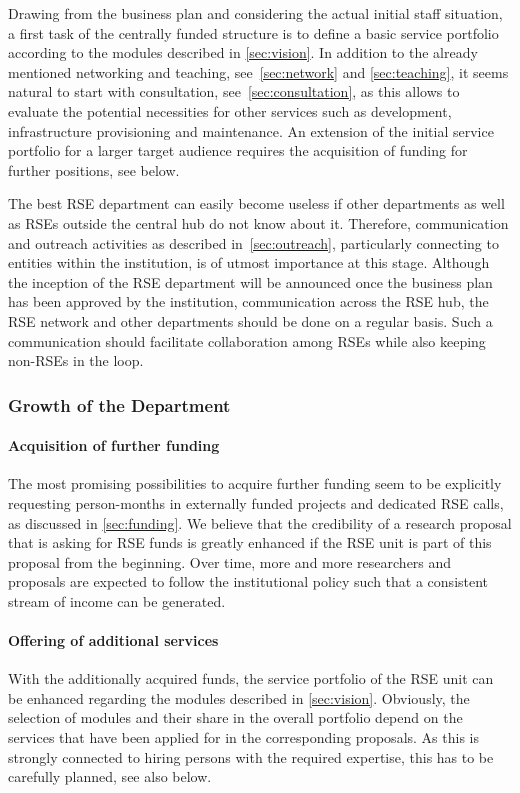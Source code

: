 \documentclass[a4paper]{article}
\begin{document}
Drawing from the business plan and considering the actual initial staff situation, a first task of the centrally funded structure is to define a basic service portfolio according to the modules described in \autoref{sec:vision}.
In addition to the already mentioned networking and teaching, see~\autoref{sec:network} and \autoref{sec:teaching}, it seems natural to start with consultation, see~\autoref{sec:consultation},
as this allows to evaluate the potential necessities for other services such as development, infrastructure provisioning and maintenance.
An extension of the initial service portfolio for a larger target audience requires the acquisition of funding for further positions, see below.

The best RSE department can easily become useless if other departments as well as RSEs outside the central hub do not know about it.
Therefore, communication and outreach activities as described in~\autoref{sec:outreach}, particularly connecting to entities within the institution, is of utmost importance at this stage.
Although the inception of the RSE department will be announced once the business plan has been approved by the institution, communication across the RSE hub, the RSE network and other departments should be done on a regular basis. 
Such a communication should facilitate collaboration among RSEs while also keeping non-RSEs in the loop. 


\subsubsection{Growth of the Department}

\paragraph{Acquisition of further funding}
The most promising possibilities to acquire further funding seem to be explicitly requesting person-months in externally funded projects and dedicated RSE calls, as discussed in \autoref{sec:funding}.
We believe that the credibility of a research proposal that is asking for RSE funds is greatly enhanced if the RSE unit is part of this proposal from the beginning.
Over time, more and more researchers and proposals are expected to follow the institutional policy such that a consistent stream of income can be generated.

\paragraph{Offering of additional services}
With the additionally acquired funds, the service portfolio of the RSE unit can be enhanced regarding the modules described in \autoref{sec:vision}.
Obviously, the selection of modules and their share in the overall portfolio depend on the services that have been applied for in the corresponding proposals.
As this is strongly connected to hiring persons with the required expertise, this has to be carefully planned, see also below.
\end{document}
